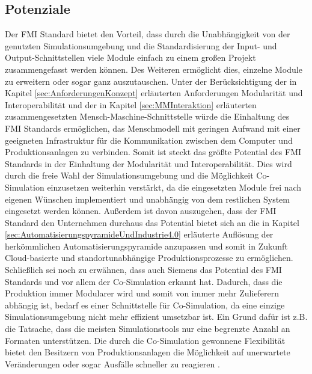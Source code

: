 \subsection{Potenziale}\label{sec:PotenzialeFMU}
Der FMI Standard bietet den Vorteil, dass durch die Unabhängigkeit von der genutzten Simulationsumgebung und die Standardisierung der Input- und Output-Schnittstellen viele Module einfach zu einem großen Projekt zusammengefasst werden können. Des Weiteren ermöglicht dies, einzelne Module zu erweitern oder sogar ganz auszutauschen.
\newline
Unter der Berücksichtigung der in Kapitel \ref{sec:AnforderungenKonzept} erläuterten Anforderungen Modularität und Interoperabilität und der in Kapitel \ref{sec:MMInteraktion} erläuterten zusammengesetzten Mensch-Maschine-Schnittstelle würde die Einhaltung des FMI Standards ermöglichen, das Menschmodell mit geringen Aufwand mit einer geeigneten Infrastruktur für die Kommunikation zwischen dem Computer und Produktionsanlagen zu verbinden.
\newline
Somit ist steckt das größte Potential des FMI Standards in der Einhaltung der Modularität und Interoperabilität. Dies wird durch die freie Wahl der Simulationsumgebung und die Möglichkeit Co-Simulation einzusetzen weiterhin verstärkt, da die eingesetzten Module frei nach eigenen Wünschen implementiert und unabhängig von dem restlichen System eingesetzt werden können. Außerdem ist davon auszugehen, dass der FMI Standard den Unternehmen durchaus das Potential bietet sich an die in Kapitel \ref{sec:AutomatisierungspyramideUndIndustrie4.0} erläuterte Auflösung der herkömmlichen Automatisierungspyramide anzupassen und somit in Zukunft Cloud-basierte und standortunabhängige Produktionsprozesse zu ermöglichen.
\newline
Schließlich sei noch zu erwähnen, dass auch Siemens das Potential des FMI Standards und vor allem der Co-Simulation erkannt hat. Dadurch, dass die Produktion immer Modularer wird und somit von immer mehr Zulieferern abhängig ist, bedarf es einer Schnittstelle für Co-Simulation, da eine einzige Simulationsumgebung nicht mehr effizient umsetzbar ist. Ein Grund dafür ist z.B. die Tatsache, dass die meisten Simulationstools nur eine begrenzte Anzahl an Formaten unterstützen. Die durch die Co-Simulation gewonnene Flexibilität bietet den Besitzern von Produktionsanlagen die Möglichkeit auf unerwartete Veränderungen oder sogar Ausfälle schneller zu reagieren \cite[S.13]{27}. 

